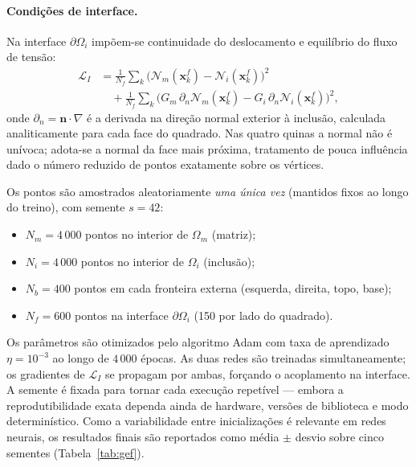 \documentclass[brazil]{TCAM} %
\begin{document}
\paragraph{Condições de interface.}
Na interface $\partial\Omega_i$ impõem-se continuidade do deslocamento e equilíbrio
do fluxo de tensão:
\begin{equation}
\begin{aligned}
    \mathcal{L}_{I}
    &= \frac{1}{N_f}\sum_k
      \bigl(\mathcal{N}_m(\mathbf{x}_k^f) - \mathcal{N}_i(\mathbf{x}_k^f)\bigr)^2 \\
    &\quad + \frac{1}{N_f}\sum_k
      \bigl(G_m\,\partial_n \mathcal{N}_m(\mathbf{x}_k^f)
           - G_i\,\partial_n \mathcal{N}_i(\mathbf{x}_k^f)\bigr)^2,
\end{aligned}
\end{equation}
onde $\partial_n = \mathbf{n}\cdot\nabla$ é a derivada na direção normal exterior à
inclusão, calculada analiticamente para cada face do quadrado. Nas quatro quinas a
normal não é unívoca; adota-se a normal da face mais próxima, tratamento de pouca
influência dado o número reduzido de pontos exatamente sobre os vértices.

Os pontos são amostrados aleatoriamente \emph{uma única vez} (mantidos fixos ao
longo do treino), com semente $s = 42$:
\begin{itemize}
    \item $N_m = 4\,000$ pontos no interior de $\Omega_m$ (matriz);
    \item $N_i = 4\,000$ pontos no interior de $\Omega_i$ (inclusão);
    \item $N_b = 400$ pontos em cada fronteira externa (esquerda, direita, topo, base);
    \item $N_f = 600$ pontos na interface $\partial\Omega_i$ (150 por lado do quadrado).
\end{itemize}

Os parâmetros são otimizados pelo algoritmo Adam \cite{kingma2015adam} com taxa de
aprendizado $\eta = 10^{-3}$ ao longo de $4\,000$ épocas. As duas redes são
treinadas simultaneamente; os gradientes de $\mathcal{L}_I$ se propagam por ambas,
forçando o acoplamento na interface. A semente é fixada para tornar cada execução
repetível --- embora a reprodutibilidade exata dependa ainda de hardware, versões de
biblioteca e modo determinístico. Como a variabilidade entre inicializações é
relevante em redes neurais, os resultados finais são reportados como média $\pm$
desvio sobre cinco sementes (Tabela~\ref{tab:gef}).
\end{document}

